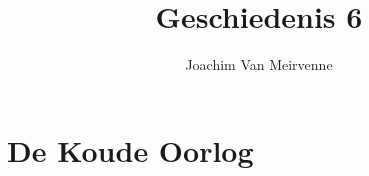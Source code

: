 \documentclass[a4paper,12pt, dutch, oneside ]{book}
\begin{document}
\author{Joachim Van Meirvenne}
\title{Geschiedenis 6}

\frontmatter
\maketitle
\tableofcontents

\mainmatter

\part{De Koude Oorlog}



\end{document}
